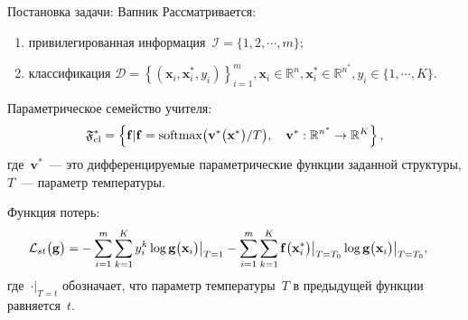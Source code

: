 \documentclass[10pt,pdf,hyperref={unicode}]{beamer}
\begin{document}
\begin{frame}{Постановка задачи: Вапник}
\justifying
Рассматривается:
\begin{enumerate}
	\item привилегированная информация~$\mathcal{I} = \{1, 2, \cdots, m\}$;
	\item классификация $\mathcal{D} = \left\{\left(\mathbf{x}_i, \mathbf{x}^*_i, y_i\right)\right\}_{i=1}^{m}, \mathbf{x}_i \in \mathbb{R}^{n}, \mathbf{x}^*_i \in \mathbb{R}^{n^*}, y_i \in \{1, \cdots, K\}$.
\end{enumerate}
Параметрическое семейство учителя:
\[
\setlength\abovedisplayskip{0pt}
\mathfrak{F}_{\text{cl}}^* = \left\{\mathbf{f}| \mathbf{f} = \text{softmax}\bigr(\mathbf{v}^*\bigr(\mathbf{x}^*\bigr)/T\bigr), \quad \mathbf{v}^*: \mathbb{R}^{n^*} \to \mathbb{R}^K \right\},
\setlength\belowdisplayskip{0pt}
\]
где~$\mathbf{v}^*$~--- это дифференцируемые параметрические функции заданной структуры, $T$~--- параметр температуры.

Функция потерь:
\[
\setlength\abovedisplayskip{0pt}
\begin{aligned}
   \mathcal{L}_{st}\bigr(\mathbf{g}\bigr) = &-\sum_{i=1}^{m}{\sum_{k=1}^{K}y^k_i\log\mathbf{g}\bigr(\mathbf{x}_i\bigr)\bigr|_{T=1}}-\sum_{i=1}^{m}{\sum_{k=1}^{K}\mathbf{f}\bigr(\mathbf{x}^*_i\bigr)\bigr|_{T=T_0}\log\mathbf{g}\bigr(\mathbf{x}_i\bigr)\bigr|_{T=T_0}},
\end{aligned}
\setlength\belowdisplayskip{0pt}
\]
где~$\cdot\bigr|_{T=t}$ обозначает, что параметр температуры~$T$ в предыдущей функции равняется~$t$.

\end{frame}
\end{document}
